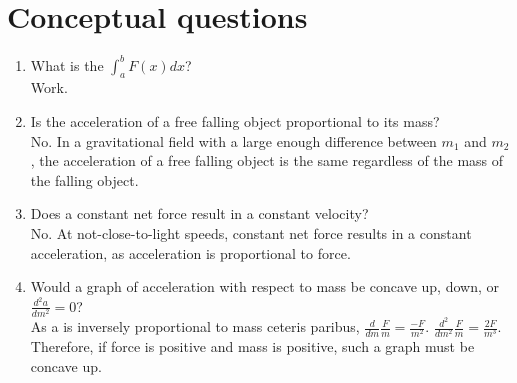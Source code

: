 \documentclass[letterpaper, 12pt]{report}
\begin{document}
\section*{Conceptual questions}
\begin{enumerate}
    \item What is the $\int_{a}^{b} F(x) dx$? \\
        Work.
    \item Is the acceleration of a free falling object proportional to its mass? \\
    No. In a gravitational field with a large enough difference between $m_1$ and $m_2$, the acceleration of a free falling object is the same regardless of the mass of the falling object.
    \item Does a constant net force result in a constant velocity? \\
    No. At not-close-to-light speeds, constant net force results in a constant acceleration, as acceleration is proportional to force.
    \item Would a graph of acceleration with respect to mass be concave up, down, or $\frac{d^2a}{dm^2} = 0$? \\
    As a is inversely proportional to mass ceteris paribus, $\frac{d}{dm} \frac{F}{m} = \frac{-F}{m^2}$. $\frac{d^2}{dm^2} \frac{F}{m} = \frac{2F}{m^3}$. Therefore, if force is positive and mass is positive, such a graph must be concave up.
\end{enumerate}
\end{document}
